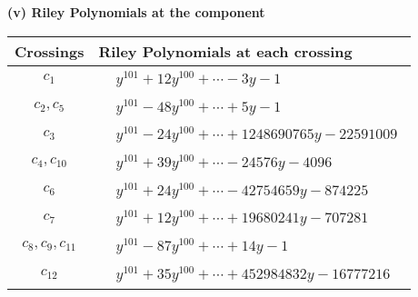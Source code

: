 \documentclass[1p]{elsarticle_modified}
\theoremstyle{definition}
\begin{document}
\newpage\renewcommand{\arraystretch}{1}
\flushleft \textbf{(v) Riley Polynomials at the component}\newline \\
\begin{tabular}{m{50pt}|m{274pt}}
Crossings & \hspace{64pt}Riley Polynomials at each crossing \\
\hline $$\begin{aligned}c_{1}\end{aligned}$$&$\begin{aligned}
&y^{101}+12 y^{100}+\cdots-3 y-1
\end{aligned}$\\
\hline $$\begin{aligned}c_{2},c_{5}\end{aligned}$$&$\begin{aligned}
&y^{101}-48 y^{100}+\cdots+5 y-1
\end{aligned}$\\
\hline $$\begin{aligned}c_{3}\end{aligned}$$&$\begin{aligned}
&y^{101}-24 y^{100}+\cdots+1248690765 y-22591009
\end{aligned}$\\
\hline $$\begin{aligned}c_{4},c_{10}\end{aligned}$$&$\begin{aligned}
&y^{101}+39 y^{100}+\cdots-24576 y-4096
\end{aligned}$\\
\hline $$\begin{aligned}c_{6}\end{aligned}$$&$\begin{aligned}
&y^{101}+24 y^{100}+\cdots-42754659 y-874225
\end{aligned}$\\
\hline $$\begin{aligned}c_{7}\end{aligned}$$&$\begin{aligned}
&y^{101}+12 y^{100}+\cdots+19680241 y-707281
\end{aligned}$\\
\hline $$\begin{aligned}c_{8},c_{9},c_{11}\end{aligned}$$&$\begin{aligned}
&y^{101}-87 y^{100}+\cdots+14 y-1
\end{aligned}$\\
\hline $$\begin{aligned}c_{12}\end{aligned}$$&$\begin{aligned}
&y^{101}+35 y^{100}+\cdots+452984832 y-16777216
\end{aligned}$\\
\hline
\end{tabular}\\~\\
\end{document}

